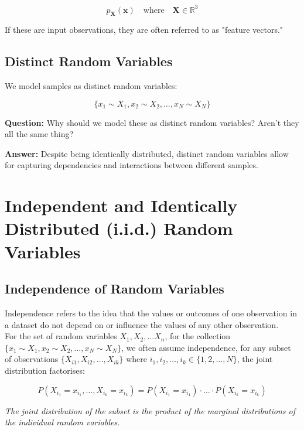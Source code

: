 \[
p_{\mathbf{X}}(\mathbf{x}) \quad \text{where} \quad \mathbf{X} \in \mathbb{R}^3
\]

If these are input observations, they are often referred to as "feature vectors."

\subsection{Distinct Random Variables}

We model samples as distinct random variables:

\[
\{x_1 \sim X_1, x_2 \sim X_2, \ldots, x_N \sim X_N\}
\]

\textbf{Question:} Why should we model these as distinct random variables? Aren't they all the same thing?

\textbf{Answer:} Despite being identically distributed, distinct random variables allow for capturing dependencies and interactions between different samples.

\section{Independent and Identically Distributed (i.i.d.) Random Variables}

\subsection{Independence of Random Variables}

Independence refers to the idea that the values or outcomes of one observation in a dataset do not depend on or influence the values of any other observation.\\

For the set of random variables $X_1, X_2, \ldots X_n$, for the collection \(\{x_1 \sim X_1, x_2 \sim X_2, \ldots, x_N \sim X_N\}\), we often assume independence, for any subset of observations \(\{X_{i1}, X_{i2}, \ldots, X_{ik}\}\) where \(i_1, i_2, \ldots, i_k \in \{1, 2, \ldots, N\}\), the joint distribution factorises:

\begin{equation}
P(X_{i_1} = x_{i_1}, \ldots, X_{i_k} = x_{i_k}) = P(X_{i_1} = x_{i_1}) \cdot \ldots \cdot P(X_{i_k} = x_{i_k})
\end{equation}

\textit{The joint distribution of the subset is the product of the marginal distributions of the individual random variables.}\\

